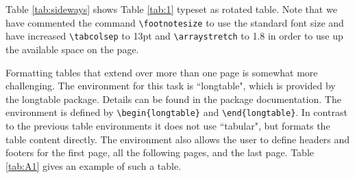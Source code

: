 \documentclass[a4paper,twoside]{article}
\begin{document}
Table \ref{tab:sideways} shows Table \ref{tab:1} typeset as rotated table. Note that we have commented the command \verb|\footnotesize| to use the standard font size and have increased \verb|\tabcolsep| to 13pt and \verb|\arraystretch| to 1.8 in order to use up the available space on the page.

Formatting tables that extend over more than one page is somewhat more challenging. The environment for this task is ``longtable", which is provided by the longtable package. Details can be found in the package documentation. The environment is defined by \verb|\begin{longtable}| and \verb|\end{longtable}|. In contrast to the previous table environments it does not use ``tabular", but formats the table content directly. The environment also allows the user to define headers and footers for the first page, all the following pages, and the last page. Table \ref{tab:A1} gives an example of such a table.
\end{document}
